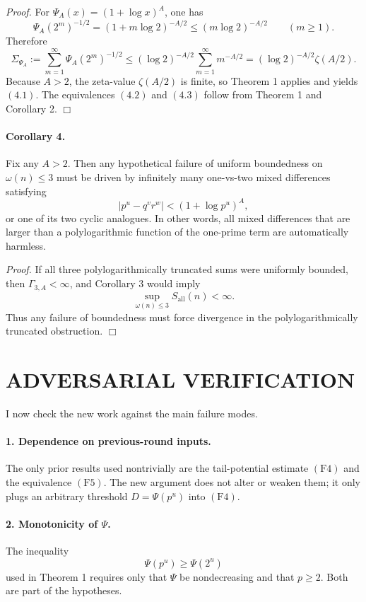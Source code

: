\emph{Proof.}
For \(\Psi_A(x)=(1+\log x)^A\), one has
\[
\Psi_A(2^m)^{-1/2}=(1+m\log 2)^{-A/2}
\le
(m\log 2)^{-A/2}
\qquad (m\ge 1).
\]
Therefore
\[
\Sigma_{\Psi_A}:=\sum_{m=1}^{\infty}\Psi_A(2^m)^{-1/2}
\le
(\log 2)^{-A/2}\sum_{m=1}^{\infty}m^{-A/2}
=
(\log 2)^{-A/2}\zeta(A/2).
\]
Because \(A>2\), the zeta-value \(\zeta(A/2)\) is finite, so Theorem 1 applies and yields \((4.1)\). The equivalences \((4.2)\) and \((4.3)\) follow from Theorem 1 and Corollary 2.
\hfill\(\Box\)

\paragraph{Corollary 4.}
Fix any \(A>2\). Then any hypothetical failure of uniform boundedness on \(\omega(n)\le 3\) must be driven by infinitely many one-vs-two mixed differences satisfying
\[
|p^u-q^v r^w|<(1+\log p^u)^A,
\]
or one of its two cyclic analogues.
In other words, all mixed differences that are larger than a polylogarithmic function of the one-prime term are automatically harmless.

\emph{Proof.}
If all three polylogarithmically truncated sums were uniformly bounded, then \(\Gamma_{3,A}<\infty\), and Corollary 3 would imply
\[
\sup_{\omega(n)\le 3}S_{\mathrm{all}}(n)<\infty.
\]
Thus any failure of boundedness must force divergence in the polylogarithmically truncated obstruction.
\hfill\(\Box\)

\section{ADVERSARIAL VERIFICATION}

I now check the new work against the main failure modes.

\paragraph{1. Dependence on previous-round inputs.}
The only prior results used nontrivially are the tail-potential estimate \((\mathrm{F4})\) and the equivalence \((\mathrm{F5})\). The new argument does not alter or weaken them; it only plugs an arbitrary threshold \(D=\Psi(p^u)\) into \((\mathrm{F4})\).

\paragraph{2. Monotonicity of \(\Psi\).}
The inequality
\[
\Psi(p^u)\ge \Psi(2^u)
\]
used in Theorem 1 requires only that \(\Psi\) be nondecreasing and that \(p\ge 2\). Both are part of the hypotheses.

